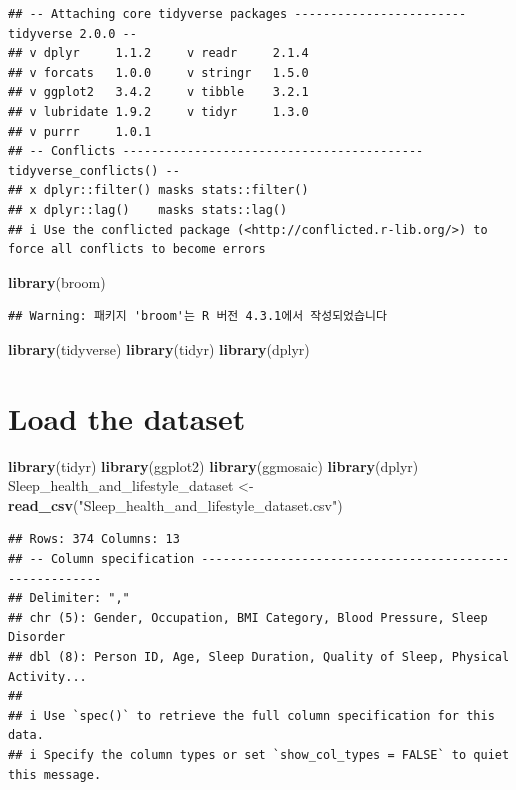 \documentclass[
  11pt,
]{article}
\newenvironment{Shaded}{\begin{snugshade}}{\end{snugshade}}
\newcommand{\FunctionTok}[1]{\textcolor[rgb]{0.13,0.29,0.53}{\textbf{#1}}}
\newcommand{\NormalTok}[1]{#1}
\newcommand{\OtherTok}[1]{\textcolor[rgb]{0.56,0.35,0.01}{#1}}
\newcommand{\StringTok}[1]{\textcolor[rgb]{0.31,0.60,0.02}{#1}}
\begin{document}
\begin{verbatim}
## -- Attaching core tidyverse packages ------------------------ tidyverse 2.0.0 --
## v dplyr     1.1.2     v readr     2.1.4
## v forcats   1.0.0     v stringr   1.5.0
## v ggplot2   3.4.2     v tibble    3.2.1
## v lubridate 1.9.2     v tidyr     1.3.0
## v purrr     1.0.1     
## -- Conflicts ------------------------------------------ tidyverse_conflicts() --
## x dplyr::filter() masks stats::filter()
## x dplyr::lag()    masks stats::lag()
## i Use the conflicted package (<http://conflicted.r-lib.org/>) to force all conflicts to become errors
\end{verbatim}

\begin{Shaded}
\begin{Highlighting}[]
\FunctionTok{library}\NormalTok{(broom)}
\end{Highlighting}
\end{Shaded}

\begin{verbatim}
## Warning: 패키지 'broom'는 R 버전 4.3.1에서 작성되었습니다
\end{verbatim}

\begin{Shaded}
\begin{Highlighting}[]
\FunctionTok{library}\NormalTok{(tidyverse)}
\FunctionTok{library}\NormalTok{(tidyr)}
\FunctionTok{library}\NormalTok{(dplyr)}
\end{Highlighting}
\end{Shaded}

\hypertarget{load-the-dataset}{%
\section{Load the dataset}\label{load-the-dataset}}

\begin{Shaded}
\begin{Highlighting}[]
\FunctionTok{library}\NormalTok{(tidyr)}
\FunctionTok{library}\NormalTok{(ggplot2)}
\FunctionTok{library}\NormalTok{(ggmosaic)}
\FunctionTok{library}\NormalTok{(dplyr)}
\NormalTok{Sleep\_health\_and\_lifestyle\_dataset }\OtherTok{\textless{}{-}} \FunctionTok{read\_csv}\NormalTok{(}\StringTok{"Sleep\_health\_and\_lifestyle\_dataset.csv"}\NormalTok{)}
\end{Highlighting}
\end{Shaded}

\begin{verbatim}
## Rows: 374 Columns: 13
## -- Column specification --------------------------------------------------------
## Delimiter: ","
## chr (5): Gender, Occupation, BMI Category, Blood Pressure, Sleep Disorder
## dbl (8): Person ID, Age, Sleep Duration, Quality of Sleep, Physical Activity...
## 
## i Use `spec()` to retrieve the full column specification for this data.
## i Specify the column types or set `show_col_types = FALSE` to quiet this message.
\end{verbatim}
\end{document}
